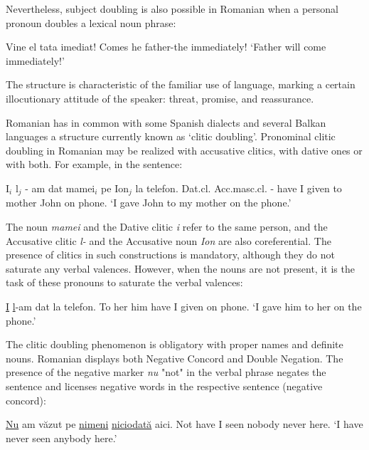 \documentclass[]{../../metanetpaper}
\begin{document}
\begin{multicols}{2}
Nevertheless, subject doubling is also possible in Romanian when a personal pronoun doubles a lexical noun phrase:

\begin{example}
\gll Vine el tata imediat!
Comes he father-the immediately!
\glt `Father will come immediately!'
\glend
\end{example}

The structure is characteristic of the familiar use of language, marking a certain illocutionary attitude of the speaker: threat, promise, and reassurance.

Romanian has in common with some Spanish dialects and several Balkan languages a structure currently known as ‘clitic doubling’. Pronominal clitic doubling in Romanian may be realized with accusative clitics, with dative ones or with both. For example, in the sentence:

\begin{example}
\gll I$_{i}$ l$_{j}$ - am dat mamei$_{i}$ pe Ion$_{j}$ la telefon.
Dat.cl. Acc.masc.cl. - {have I} given {to mother} {} John on phone.
\glt `I gave John to my mother on the phone.'
\glend
\end{example}

The noun \textit{mamei} and the Dative clitic \textit{i} refer to the same person, and the Accusative clitic \textit{l-} and the Accusative noun \textit{Ion} are also coreferential. The presence of clitics in such constructions is mandatory, although they do not saturate any verbal valences. However, when the nouns are not present, it is the task of these pronouns to saturate the verbal valences:

\begin{example}
\gll \underline{I} \underline{l}-am dat la telefon.
{To her} {him have I} given on phone.
\glt `I gave him to her on the phone.'
\glend
\end{example}

The clitic doubling phenomenon is obligatory with proper names and definite nouns.
Romanian displays both Negative Concord and Double Negation. The presence of the negative marker \textit{nu} "not" in the verbal phrase negates the sentence and licenses negative words in the respective sentence (negative concord):

\begin{example}
\gll \underline{Nu} am văzut pe \underline{nimeni} \underline{niciodată} aici.
Not {have I} seen {} nobody never here.
\glt `I have never seen anybody here.'
\glend
\end{example}


\end{multicols}
\end{document}
